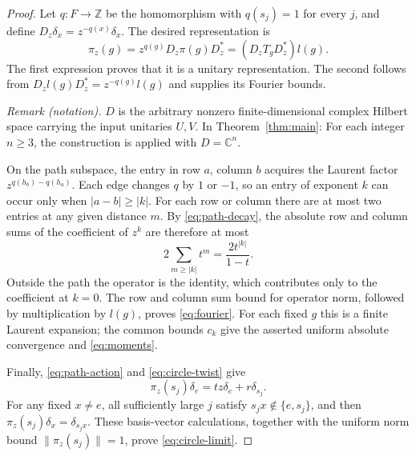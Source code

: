 \begin{proof}
Let $q:F\to\mathbb Z$ be the homomorphism with $q(s_j)=1$ for every
$j$, and define $D_z\delta_x=z^{-q(x)}\delta_x$. The desired
representation is
\begin{equation}\label{eq:circle-twist}
 \pi_z(g)=z^{q(g)}D_z\pi(g)D_z^*
          =(D_zT_gD_z^*)l(g).
\end{equation}
The first expression proves that it is a unitary representation. The
second follows from $D_zl(g)D_z^*=z^{-q(g)}l(g)$ and supplies its
Fourier bounds.

\noindent\textit{Remark (notation).} $D$ is the arbitrary nonzero finite-dimensional complex Hilbert space carrying the input unitaries $U,V$. In Theorem~\ref{thm:main}: For each integer $n\geq3$, the construction is applied with $D=\mathbb C^n$.


On the path subspace, the entry in row $a$, column $b$ acquires the
Laurent factor $z^{q(h_b)-q(h_a)}$. Each edge changes $q$ by $1$ or
$-1$, so an entry of exponent $k$ can occur only when $|a-b|\geq|k|$.
For each row or column there are at most two entries at any given
distance $m$. By \eqref{eq:path-decay}, the absolute row and column
sums of the coefficient of $z^k$ are therefore at most
\[
 2\sum_{m\geq|k|}t^m=\frac{2t^{|k|}}{1-t}.
\]
Outside the path the operator is the identity, which contributes only
to the coefficient at $k=0$. The row and column sum bound for operator
norm, followed by multiplication by $l(g)$, proves
\eqref{eq:fourier}. For each fixed $g$ this is a finite Laurent
expansion; the common bounds $c_k$ give the asserted uniform absolute
convergence and \eqref{eq:moments}.

Finally, \eqref{eq:path-action} and \eqref{eq:circle-twist} give
\[
 \pi_z(s_j)\delta_e=tz\delta_e+r\delta_{s_j}.
\]
For any fixed $x\ne e$, all sufficiently large $j$ satisfy
$s_jx\notin\{e,s_j\}$, and then
$\pi_z(s_j)\delta_x=\delta_{s_jx}$. These basis-vector calculations,
together with the uniform norm bound $\|\pi_z(s_j)\|=1$, prove
\eqref{eq:circle-limit}.
\end{proof}
